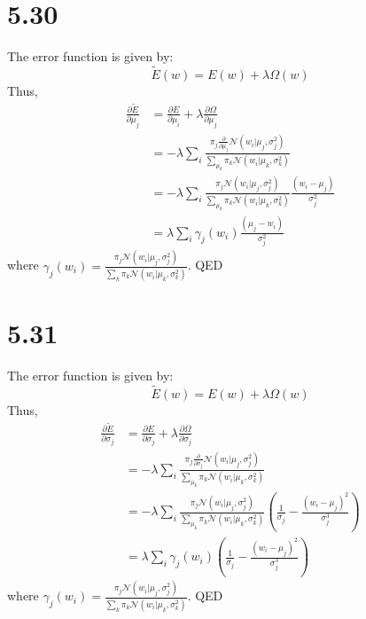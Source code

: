 \documentclass[10pt,a4paper,draft]{book}
\begin{document}
\section*{5.30}
The error function is given by:
\begin{equation}
\tilde{E}(w) = E(w) + \lambda \Omega(w)
\end{equation}
Thus,
\begin{equation}
\begin{aligned}
\frac{\partial \tilde{E}}{\partial \mu_j} &= \frac{\partial E}{\partial \mu_i} + \lambda \frac{\partial \Omega}{\partial \mu_j} \\
&= - \lambda \sum_{i} \frac{\pi_j \frac{\partial}{\partial \mu_j} \mathcal{N}(w_i|\mu_j,\sigma_j^2)}{\sum_{\mu_k}\pi_k \mathcal{N}(w_i|\mu_k,\sigma^2_k)}  \\
&= - \lambda \sum_{i} \frac{\pi_j \mathcal{N}(w_i|\mu_j,\sigma_j^2)}{\sum_{\mu_k}\pi_k \mathcal{N}(w_i|\mu_k,\sigma^2_k)} \frac{(w_i-\mu_j)}{\sigma^2_j} \\
&= \lambda \sum_{i} \gamma_j(w_i)\frac{(\mu_j-w_i)}{\sigma^2_j}
\end{aligned} 
\end{equation}
where $\gamma_j(w_i) = \frac{\pi_j \mathcal{N}(w_i|\mu_j,\sigma_j^2)}{\sum_{k}\pi_k \mathcal{N}(w_i|\mu_k,\sigma^2_k)}$. QED

\section*{5.31}
The error function is given by:
\begin{equation}
\tilde{E}(w) = E(w) + \lambda \Omega(w)
\end{equation}
Thus,
\begin{equation}
\begin{aligned}
\frac{\partial \tilde{E}}{\partial \sigma_j} &= \frac{\partial E}{\partial \sigma_j} + \lambda \frac{\partial \Omega}{\partial \sigma_j} \\
&=  - \lambda \sum_{i} \frac{\pi_j \frac{\partial}{\partial \sigma_j} \mathcal{N}(w_i|\mu_j,\sigma_j^2)}{\sum_{\mu_k}\pi_k \mathcal{N}(w_i|\mu_k,\sigma^2_k)}  \\
&=  - \lambda \sum_{i} \frac{\pi_j \mathcal{N}(w_i|\mu_j,\sigma_j^2)}{\sum_{\mu_k}\pi_k \mathcal{N}(w_i|\mu_k,\sigma^2_k)} \left(\frac{1}{\sigma_j} - \frac{(w_i-\mu_j)^2}{\sigma^3_j}\right) \\
&=  \lambda \sum_{i} \gamma_j(w_i) \left(\frac{1}{\sigma_j} - \frac{(w_i-\mu_j)^2}{\sigma^3_j}\right)
\end{aligned} 
\end{equation}
where $\gamma_j(w_i) = \frac{\pi_j \mathcal{N}(w_i|\mu_j,\sigma_j^2)}{\sum_{k}\pi_k \mathcal{N}(w_i|\mu_k,\sigma^2_k)}$. QED
\end{document}
